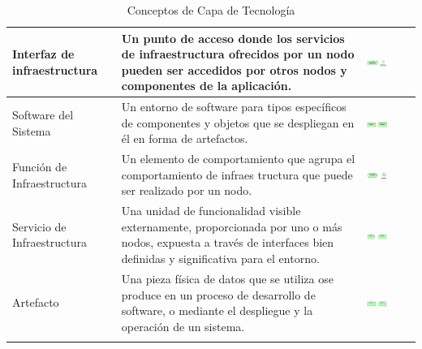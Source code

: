 \begin{center}
\begin{longtable}[H]{| >{\centering\arraybackslash}m{3cm} | >{\arraybackslash}m{6cm} | p{4cm} | p{5cm} | p{4cm} |}
		Interfaz de 
		infraestructura &\vspace{1mm} Un punto de acceso donde los servicios
		de infraestructura ofrecidos por un nodo 
		pueden ser accedidos por otros nodos y 
		componentes de la aplicación.
		&  \includegraphics[width=35mm,trim=0 0 0 -2mm]{imagenes/lenguaje/tecnologia/interfaz}  \\ \hline
		
		Software del  
		Sistema
		&\vspace{1mm} Un entorno de software para tipos específicos de componentes y objetos que
		se despliegan en él en forma de artefactos.
		& \includegraphics[width=35mm,trim=0 0 0 -2mm]{imagenes/lenguaje/tecnologia/software}  \\ \hline 
		
		Función de 
		Infraestructura 
		&\vspace{1mm} Un elemento de comportamiento que agrupa el comportamiento de infraes
		tructura que puede ser realizado por un	nodo.
		& \includegraphics[width=35mm,trim=0 0 0 -2mm]{imagenes/lenguaje/tecnologia/funcion}  \\ \hline 	
		
		Servicio de 
		Infraestructura 
		&\vspace{1mm} Una unidad de funcionalidad visible externamente, proporcionada por uno o más nodos, expuesta a través de interfaces bien definidas y significativa para el entorno.
		&  \includegraphics[width=35mm,trim=0 0 0 -2mm]{imagenes/lenguaje/tecnologia/servicio} \\ \hline 
		
		Artefacto 
		&\vspace{1mm} Una pieza física de datos que se utiliza ose produce en un proceso de desarrollo de software, o mediante el despliegue y la operación de un sistema. 
		& \includegraphics[width=35mm,trim=0 0 0 -2mm]{imagenes/lenguaje/tecnologia/artefacto}  \\ \hline
		

	\caption{Conceptos de Capa de Tecnología}
	
\end{longtable}
\end{center}


